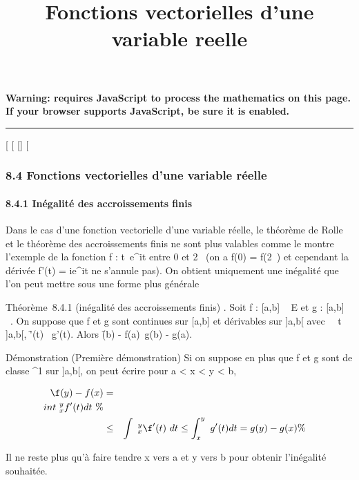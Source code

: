 \documentclass[]{article}
\title{Fonctions vectorielles d'une variable reelle}
\author{}
\date{}
\begin{document}
\maketitle

\textbf{Warning: 
requires JavaScript to process the mathematics on this page.\\ If your
browser supports JavaScript, be sure it is enabled.}

\begin{center}\rule{3in}{0.4pt}\end{center}

[
[
[]
[

\subsubsection{8.4 Fonctions vectorielles d'une variable réelle}

\paragraph{8.4.1 Inégalité des accroissements finis}

Dans le cas d'une fonction vectorielle d'une variable réelle, le
théorème de Rolle et le théorème des accroissements finis ne sont plus
valables comme le montre l'exemple de la fonction f :
t\mapsto~e^it entre 0 et 2\pi~ (on a f(0) =
f(2\pi~) et cependant la dérivée f'(t) = ie^it ne s'annule pas).
On obtient uniquement une inégalité que l'on peut mettre sous une forme
plus générale

Théorème~8.4.1 (inégalité des accroissements finis) . Soit f : [a,b]
\rightarrow~ E et g : [a,b] \rightarrow~ ~. On suppose que f et g sont continues sur
[a,b] et dérivables sur ]a,b[ avec \forall~~t
\in]a,b[, \f'(t)\ \leq
g'(t). Alors \f(b) -
f(a)\ \leq g(b) - g(a).

Démonstration (Première démonstration) Si on suppose en plus que f et g
sont de classe ^1 sur ]a,b[, on peut écrire pour a
< x < y < b,

\begin{align*} \f(y) -
f(x)& =&
\\int ~
_x^yf'(t) dt\ \%&
\\ & \leq& \int ~
_x^y\f'(t)\
dt \leq\int  _x^y~g'(t) dt = g(y) -
g(x)\%& \\
\end{align*}

Il ne reste plus qu'à faire tendre x vers a et y vers b pour obtenir
l'inégalité souhaitée.
\end{document}
